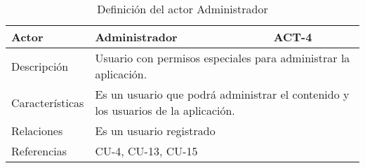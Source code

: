 \begin{table}[H]
    \begin{tabular}{|p{3cm}|p{5cm}|p{2cm}|}
        \hline
        Actor & Administrador & ACT-4 \\
        \hline
        Descripción & \multicolumn{2}{|p{7cm}|}{Usuario con permisos especiales para
        administrar la aplicación.} \\
        \hline
        Características & \multicolumn{2}{|p{7cm}|}{Es un usuario que podrá administrar
        el contenido y los usuarios de la aplicación.} \\
        \hline
        Relaciones & \multicolumn{2}{|p{7cm}|}{Es un usuario registrado} \\
        \hline
        Referencias & \multicolumn{2}{|p{7cm}|}{CU-4, CU-13, CU-15} \\
        \hline
    \end{tabular}
    \caption{Definición del actor Administrador}
    \label{tab:actor_administrador}
\end{table}